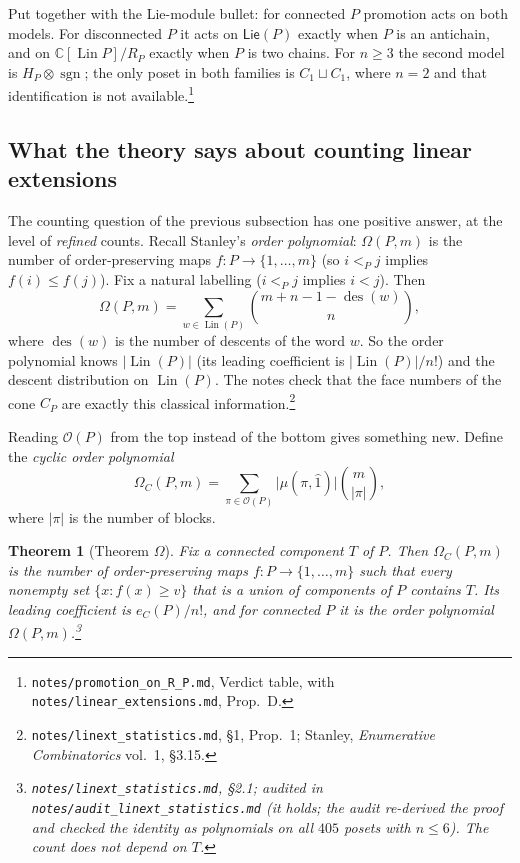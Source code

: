 \documentclass[11pt]{article}
\newtheorem{theorem}{Theorem}
\theoremstyle{definition}
\theoremstyle{remark}
\newcommand{\OP}{\mathcal O}
\newcommand{\Lin}{\operatorname{Lin}}
\newcommand{\PLie}{\mathsf{Lie}}
\newcommand{\sgn}{\operatorname{sgn}}
\newcommand{\src}[1]{\nolinkurl{#1}}
\newcommand{\tagbox}[1]{\leavevmode\marginpar{\raggedright\fbox{\parbox{0.66in}{\centering\scriptsize\sffamily #1}}}}
\newcommand{\PROVEN}{\tagbox{PROVEN\\AUDITED}}
\newcommand{\CITED}{\tagbox{CLASSICAL\\(CITED)}}
\begin{document}
Put together with the Lie-module bullet: for connected $P$ promotion acts
on both models. For disconnected $P$ it acts on $\PLie(P)$ exactly when $P$
is an antichain, and on $\mathbb C[\Lin P]/R_P$ exactly when $P$ is two
chains. For $n\ge3$ the second model is $H_P\otimes\sgn$; the only poset in
both families is $C_1\sqcup C_1$, where $n=2$ and that identification is
not available.\footnote{\src{notes/promotion_on_R_P.md}, Verdict table,
with \src{notes/linear_extensions.md}, Prop.~D.}

\subsection{What the theory says about counting linear extensions}

The counting question of the previous subsection has one positive answer, at the level of
\emph{refined} counts. Recall Stanley's \emph{order polynomial}:
$\Omega(P,m)$ is the number of order-preserving maps $f:P\to\{1,\dots,m\}$
(so $i<_Pj$ implies $f(i)\le f(j)$). Fix a natural labelling ($i<_Pj$
implies $i<j$). Then
\[
\Omega(P,m)=\sum_{w\in\Lin(P)}\binom{m+n-1-\operatorname{des}(w)}{n},
\]
where $\operatorname{des}(w)$ is the number of descents of the word $w$. So
the order polynomial knows $|\Lin(P)|$ (its leading coefficient is
$|\Lin(P)|/n!$) and the descent distribution on $\Lin(P)$.\CITED{} The
notes check that the face numbers of the cone $C_P$ are exactly this
classical information.\footnote{\src{notes/linext_statistics.md}, \S1,
Prop.~1; Stanley, \emph{Enumerative Combinatorics} vol.~1, \S3.15.}

Reading $\OP(P)$ from the top instead of the bottom gives something new.
Define the \emph{cyclic order polynomial}
\[
\Omega_C(P,m)=\sum_{\pi\in\OP(P)}\bigl|\mu(\pi,\hat1)\bigr|\binom{m}{|\pi|},
\]
where $|\pi|$ is the number of blocks.

\begin{theorem}[Theorem $\Omega$]\label{thm:omega}\PROVEN
Fix a connected component $T$ of $P$. Then $\Omega_C(P,m)$ is the number of
order-preserving maps $f:P\to\{1,\dots,m\}$ such that every nonempty set
$\{x: f(x)\ge v\}$ that is a union of components of $P$ contains $T$. Its
leading coefficient is $e_C(P)/n!$, and for connected $P$ it is the order
polynomial $\Omega(P,m)$.\footnote{\src{notes/linext_statistics.md},
\S2.1; audited in \src{notes/audit_linext_statistics.md} (it holds; the
audit re-derived the proof and checked the identity as polynomials on all
$405$ posets with $n\le6$). The count does not depend on $T$.}
\end{theorem}
\end{document}
